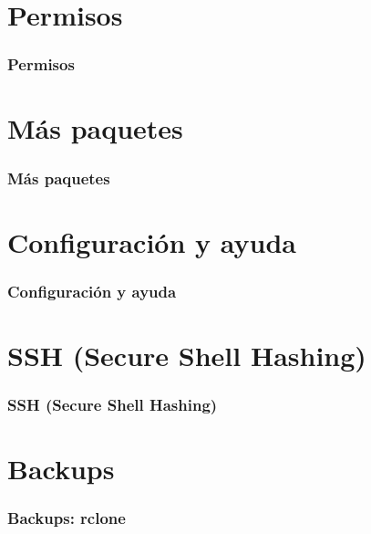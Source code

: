 \documentclass[aspectratio=43]{beamer}
\begin{document}
\section{Permisos}

\begin{frame}
    \frametitle{Permisos}
    
\end{frame}


\section{Más paquetes}

\begin{frame}
    \frametitle{Más paquetes}
    
\end{frame}


\section{Configuración y ayuda}

\begin{frame}
    \frametitle{Configuración y ayuda}
    
\end{frame}


\section{SSH (Secure Shell Hashing)}


\begin{frame}
    \frametitle{SSH (Secure Shell Hashing)}
    
\end{frame}



\section{Backups}

\begin{frame}
    \frametitle{Backups: rclone}
    
\end{frame}
\end{document}
